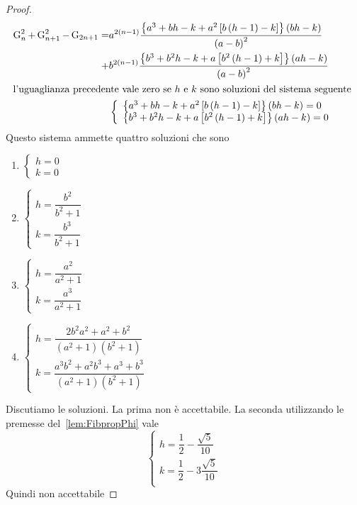 \begin{proof}
\begin{align*}
\operatorname{G}_{n}^2+\operatorname{G}_{n+1}^2-\operatorname{G}_{2n+1}=&a^{2(n-1)}\dfrac{\left\{a^3+bh-k+a^2\left[b\left(h-1\right)-k\right]\right\}\left(bh-k\right)}{\left(a-b\right)^2}\\
+&b^{2(n-1)}\dfrac{\left\{b^3+b^2h-k+a\left[b^2\left(h-1\right)+k\right]\right\}\left(ah-k\right)}{\left(a-b\right)^2}\\
\intertext{l'uguaglianza precedente vale zero se $h$ e $k$ sono soluzioni del sistema seguente }
&\left\{
\begin{array}{l}
\left\{a^3+bh-k+a^2\left[b\left(h-1\right)-k\right]\right\}\left(bh-k\right)=0\\
\left\{b^3+b^2h-k+a\left[b^2\left(h-1\right)+k\right]\right\}\left(ah-k\right)=0
\end{array}
\right.
\end{align*}
Questo sistema ammette quattro soluzioni che sono
\begin{enumerate}
	\item $\left\{
	\begin{array}{l}
		h=0\\
		k=0
	\end{array}
	\right.$
		\item $\left\{
	\begin{array}{l}
		h=\dfrac{b^2}{b^2+1}\\
		k=\dfrac{b^3}{b^2+1}
	\end{array}
	\right.$
		\item $\left\{
	\begin{array}{l}
		h=\dfrac{a^2}{a^2+1}\\
		k=\dfrac{a^3}{a^2+1}
	\end{array}
	\right.$
		\item $\left\{
	\begin{array}{l}
		h=\dfrac{2b^2a^2+a^2+b^2}{(a^2+1)(b^2+1)}\\
		k=\dfrac{a^3b^2+a^2b^3+a^3+b^3}{(a^2+1)(b^2+1)}
	\end{array}
	\right.$
\end{enumerate}
Discutiamo le soluzioni. La prima non è accettabile. La seconda utilizzando  le premesse del~\vref{lem:FibpropPhi} vale	
 \[\left\{
\begin{array}{l}
	h=\dfrac{1}{2}-\dfrac{\sqrt{5}}{10}\\
	k=\dfrac{1}{2}-3\dfrac{\sqrt{5}}{10}\\
\end{array}
\right.\]
Quindi non accettabile

\end{proof}
